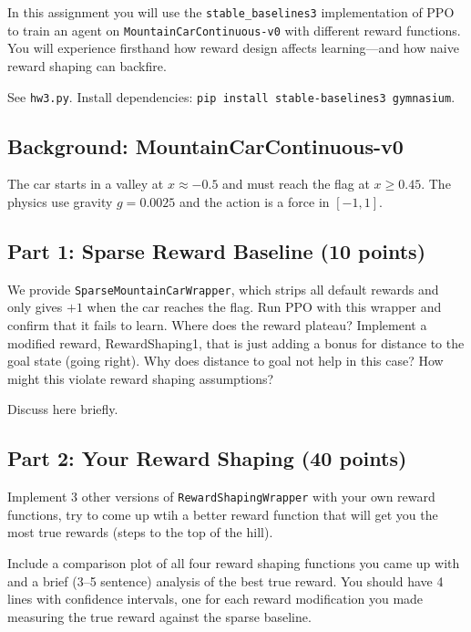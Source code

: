 \documentclass[11pt]{article}
\begin{document}
In this assignment you will use the \texttt{stable\_baselines3}
implementation of PPO to train an agent on \texttt{MountainCarContinuous-v0}
with different reward functions.  You will experience firsthand how reward
design affects learning---and how naive reward shaping can backfire.

See \texttt{hw3.py}.  Install dependencies:
\texttt{pip install stable-baselines3 gymnasium}.

\subsection*{Background: MountainCarContinuous-v0} 

The car starts in a valley at $x \approx -0.5$ and must reach the flag at
$x \geq 0.45$. The physics use gravity
$g = 0.0025$ and the action is a force in $[-1, 1]$.

\subsection*{Part 1: Sparse Reward Baseline (10 points)}

We provide \texttt{SparseMountainCarWrapper}, which strips all default
rewards and only gives $+1$ when the car reaches the flag.  Run PPO
with this wrapper and confirm that it fails to learn. Where does the reward plateau? Implement a modified reward, RewardShaping1, that is just adding a bonus for distance to the goal state (going right). Why does distance to goal not help in this case? How might this violate reward shaping assumptions?

\begin{solution}
Discuss here briefly.
\end{solution}

\subsection*{Part 2: Your Reward Shaping (40 points)}

Implement 3 other versions of \texttt{RewardShapingWrapper} with your own reward functions, try to come up wtih a better reward function that will get you the most true rewards (steps to the top of the hill).

\begin{solution}
Include a comparison plot of all four reward shaping functions you came up with and a brief (3--5 sentence) analysis
of the best true reward. You should have 4 lines with confidence intervals, one for each reward modification you made measuring the true reward against the sparse baseline.
\end{solution}
\end{document}
